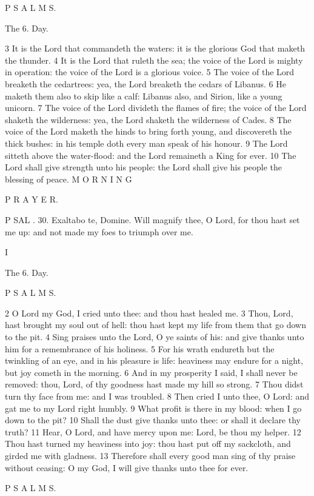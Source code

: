 P S A L M S.

The 6. Day.

3 It is the Lord that commandeth the waters: it is the glorious God that maketh the thunder. 4 It is the Lord that ruleth the sea; the voice of the Lord is mighty in operation: the voice of the Lord is a glorious voice. 5 The voice of the Lord breaketh the cedartrees: yea, the Lord breaketh the cedars of Libanus. 6 He maketh them also to skip like a calf: Libanus also, and Sirion, like a young unicorn. 7 The voice of the Lord divideth the flames of fire; the voice of the Lord shaketh the wilderness: yea, the Lord shaketh the wilderness of Cades. 8 The voice of the Lord maketh the hinds to bring forth young, and discovereth the thick bushes: in his temple doth every man speak of his honour. 9 The Lord sitteth above the water-flood: and the Lord remaineth a King for ever. 10 The Lord shall give strength unto his people: the Lord shall give his people the blessing of peace. M O R N I N G

P R A Y E R.

P SAL . 30. Exaltabo te, Domine. Will magnify thee, O Lord, for thou hast set me up: and not made my foes to triumph over me.

I

The 6. Day.

P S A L M S.

2 O Lord my God, I cried unto thee: and thou hast healed me. 3 Thou, Lord, hast brought my soul out of hell: thou hast kept my life from them that go down to the pit. 4 Sing praises unto the Lord, O ye saints of his: and give thanks unto him for a remembrance of his holiness. 5 For his wrath endureth but the twinkling of an eye, and in his pleasure is life: heaviness may endure for a night, but joy cometh in the morning. 6 And in my prosperity I said, I shall never be removed: thou, Lord, of thy goodness hast made my hill so strong. 7 Thou didst turn thy face from me: and I was troubled. 8 Then cried I unto thee, O Lord: and gat me to my Lord right humbly. 9 What profit is there in my blood: when I go down to the pit? 10 Shall the dust give thanks unto thee: or shall it declare thy truth? 11 Hear, O Lord, and have mercy upon me: Lord, be thou my helper. 12 Thou hast turned my heaviness into joy: thou hast put off my sackcloth, and girded me with gladness. 13 Therefore shall every good man sing of thy praise without ceasing: O my God, I will give thanks unto thee for ever.

P S A L M S.

